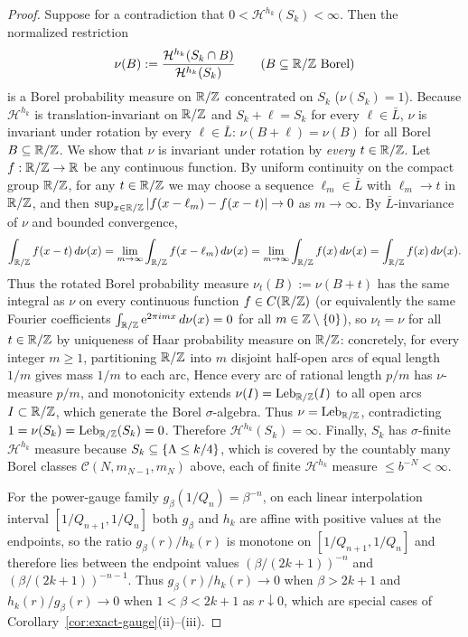 \begin{proof}
Suppose for a contradiction that $0<\mathcal H^{h_k}(S_k)<\infty$. Then the
normalized restriction
\[
\nu(B):=\frac{\mathcal H^{h_k}(S_k\cap B)}{\mathcal H^{h_k}(S_k)}
\qquad(B\subseteq\mathbb{R}/\mathbb{Z}\text{ Borel})
\]
is a Borel probability measure on $\mathbb{R}/\mathbb{Z}$ concentrated on $S_k$ ($\nu(S_k)=1$).
Because $\mathcal H^{h_k}$ is translation-invariant on $\mathbb{R}/\mathbb{Z}$ and $S_k+\ell=S_k$
for every $\ell\in\bar L$, $\nu$ is invariant under rotation by every
$\ell\in\bar L$: $\nu(B+\ell)=\nu(B)$ for all Borel $B\subseteq\mathbb{R}/\mathbb{Z}$. We show
that $\nu$ is invariant under rotation by \emph{every} $t\in\mathbb{R}/\mathbb{Z}$. Let
$f:\mathbb{R}/\mathbb{Z}\to\mathbb{R}$ be any continuous function. By uniform continuity on the compact
group $\mathbb{R}/\mathbb{Z}$, for any $t\in\mathbb{R}/\mathbb{Z}$ we may choose a sequence $\ell_m\in\bar L$
with $\ell_m\to t$ in $\mathbb{R}/\mathbb{Z}$, and then
$\sup_{x\in\mathbb{R}/\mathbb{Z}}|f(x-\ell_m)-f(x-t)|\to0$ as $m\to\infty$. By $\bar L$-invariance
of $\nu$ and bounded convergence,
\[
\int_{\mathbb{R}/\mathbb{Z}}f(x-t)\,d\nu(x)
=\lim_{m\to\infty}\int_{\mathbb{R}/\mathbb{Z}}f(x-\ell_m)\,d\nu(x)
=\lim_{m\to\infty}\int_{\mathbb{R}/\mathbb{Z}}f(x)\,d\nu(x)
=\int_{\mathbb{R}/\mathbb{Z}}f(x)\,d\nu(x).
\]
Thus the rotated Borel probability measure $\nu_t(B):=\nu(B+t)$ has the same
integral as $\nu$ on every continuous function $f\in C(\mathbb{R}/\mathbb{Z})$ (or equivalently
the same Fourier coefficients $\int_{\mathbb{R}/\mathbb{Z}}\mathrm{e}^{2\pi i m x}\,d\nu(x)=0$ for all
$m\in\mathbb{Z}\setminus\{0\}$), so $\nu_t=\nu$ for all $t\in\mathbb{R}/\mathbb{Z}$ by uniqueness of
Haar probability measure on $\mathbb{R}/\mathbb{Z}$: concretely, for every integer $m\ge1$,
partitioning $\mathbb{R}/\mathbb{Z}$ into $m$ disjoint half-open arcs of equal length $1/m$
gives mass $1/m$ to each arc, Hence every arc of rational length $p/m$ has
$\nu$-measure $p/m$, and monotonicity extends $\nu(I)=\operatorname{Leb}_{\mathbb{R}/\mathbb{Z}}(I)$
to all open arcs $I\subset\mathbb{R}/\mathbb{Z}$, which generate the Borel $\sigma$-algebra.
Thus $\nu=\operatorname{Leb}_{\mathbb{R}/\mathbb{Z}}$, contradicting
$1=\nu(S_k)=\operatorname{Leb}_{\mathbb{R}/\mathbb{Z}}(S_k)=0$. Therefore
$\mathcal H^{h_k}(S_k)=\infty$. Finally, $S_k$ has $\sigma$-finite
$\mathcal H^{h_k}$ measure because $S_k\subseteq\{\Lambda\le k/4\}$, which is
covered by the countably many Borel classes $\mathcal C(N,m_{N-1},m_N)$ above,
each of finite $\mathcal H^{h_k}$ measure $\le b^{-N}<\infty$.

For the power-gauge family $g_\beta(1/Q_n)=\beta^{-n}$, on each linear
interpolation interval $[1/Q_{n+1},1/Q_n]$ both $g_\beta$ and $h_k$ are affine
with positive values at the endpoints, so the ratio $g_\beta(r)/h_k(r)$ is
monotone on $[1/Q_{n+1},1/Q_n]$ and therefore lies between the endpoint values
$(\beta/(2k+1))^{-n}$ and $(\beta/(2k+1))^{-n-1}$. Thus
$g_\beta(r)/h_k(r)\to0$ when $\beta>2k+1$ and $h_k(r)/g_\beta(r)\to0$ when
$1<\beta<2k+1$ as $r\downarrow0$, which are special cases of
Corollary~\ref{cor:exact-gauge}(ii)--(iii).


\end{proof}
